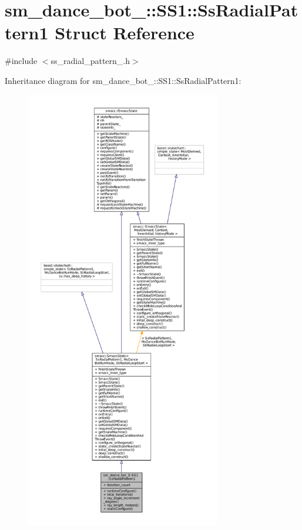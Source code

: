 \hypertarget{structsm__dance__bot__3_1_1SS1_1_1SsRadialPattern1}{}\section{sm\+\_\+dance\+\_\+bot\+\_\+:\+:S\+S1\+:\+:Ss\+Radial\+Pattern1 Struct Reference}
\label{structsm__dance__bot__3_1_1SS1_1_1SsRadialPattern1}


{\ttfamily \#include $<$ss\+\_\+radial\+\_\+pattern\+\_.\+h$>$}



Inheritance diagram for sm\+\_\+dance\+\_\+bot\+\_\+:\+:S\+S1\+:\+:Ss\+Radial\+Pattern1\+:
\nopagebreak
\begin{figure}[H]
\begin{center}
\leavevmode
\includegraphics[height=550pt]{structsm__dance__bot__3_1_1SS1_1_1SsRadialPattern1__inherit__graph}
\end{center}
\end{figure}


